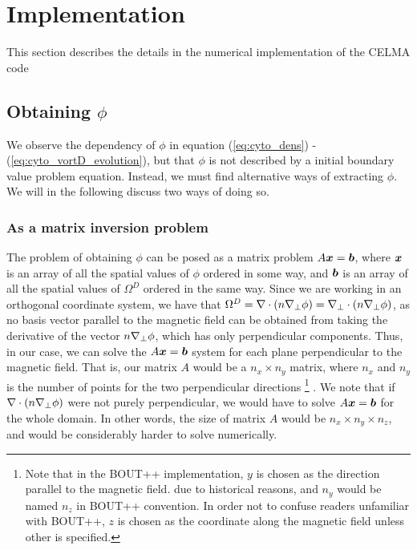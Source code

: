 \section{Implementation}
\label{sec:implementation}
This section describes the details in the numerical implementation of the CELMA
code

\subsection{Obtaining \texorpdfstring{$\phi$}{the potential}}
%
We observe the dependency of $\phi$ in equation (\ref{eq:cyto_dens}) -
(\ref{eq:cyto_vortD_evolution}), but that $\phi$ is not described by a
initial boundary value problem equation. Instead, we must find alternative ways
of extracting $\phi$. We will in the following discuss two ways of doing so.

\subsubsection{As a matrix inversion problem}
%
The problem of obtaining $\phi$ can be posed as a matrix problem
$A\boldsymbol{x}=\boldsymbol{b}$, where $\boldsymbol{x}$ is an array of all the spatial values of
$\phi$ ordered in some way, and $\boldsymbol{b}$ is an array of all the spatial values
of $\Omega^D$ ordered in the same way. Since we are working in an orthogonal
coordinate system, we have that $\Omega^D = \nabla\cdot\left(n\nabla_\perp\phi\right) =
\nabla_\perp\cdot\left(n\nabla_\perp\phi\right)$, as no basis vector parallel to the
magnetic field can be obtained from taking the derivative of the vector
$n\nabla_\perp\phi$, which has only perpendicular components. Thus, in our case,
we can solve the $A\boldsymbol{x}=\boldsymbol{b}$ system for each plane perpendicular to the
magnetic field. That is, our matrix $A$ would be a $n_x \times n_y$ matrix,
where $n_x$ and $n_y$ is the number of points for the two perpendicular
directions
%
\footnote{
Note that in the BOUT++ implementation, $y$ is chosen as the direction parallel
to the magnetic field.  due to historical reasons, and $n_y$ would be named
$n_z$ in BOUT++ convention.  In order not to confuse readers unfamiliar with
BOUT++, $z$ is chosen as the coordinate along the magnetic field unless other
is specified.
}%
%
. We note that if $\nabla\cdot\left(n\nabla_\perp\phi\right)$ were not purely
perpendicular, we would have to solve $A\boldsymbol{x}=\boldsymbol{b}$ for the whole domain. In
other words, the size of matrix $A$ would be $n_x \times n_y \times n_z$, and
would be considerably harder to solve numerically.

